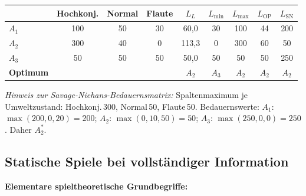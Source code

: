 \begin{table}[H]
\centering
\begin{tabular}{lcccccccc} %
\hline
 & Hochkonj. & Normal & Flaute & $L_L$ & $L_{\min}$ & $L_{\max}$ & $L_{\mathrm{OP}}$ & $L_{\mathrm{SN}}$ \\
\hline
$A_1$ & 100 & 50 & 30 & 60{,}0 & 30 & 100 & 44 & 200 \\
$A_2$ & 300 & 40 & 0  & 113{,}3 & 0 & 300 & 60 & 50 \\
$A_3$ & 50  & 50 & 50 & 50{,}0 & 50 & 50  & 50 & 250 \\
\hline
\textbf{Optimum} & & & & $A_2$ & $A_3$ & $A_2$ & $A_2$ & $A_2$ \\ %
\hline
\end{tabular}
\end{table}

\textit{Hinweis zur Savage-Niehans-Bedauernsmatrix:} Spaltenmaximum je Umweltzustand: Hochkonj.\,300, Normal\,50, Flaute\,50. Bedauernswerte: $A_1$: $\max(200,0,20)=200$; $A_2$: $\max(0,10,50)=50$; $A_3$: $\max(250,0,0)=250$. Daher $A_2^*$.

\newpage

\subsection{Statische Spiele bei vollständiger Information}

\textbf{Elementare spieltheoretische Grundbegriffe:}

